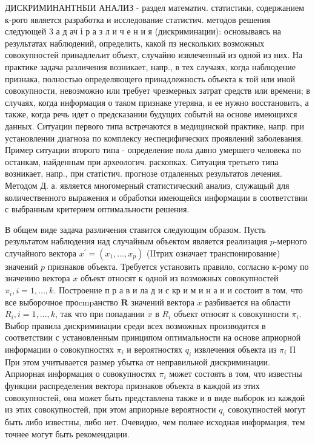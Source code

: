 \documentclass[10pt]{article}
\begin{document}
ДИСКРИМИНАНТНБІИ АНАЛИЗ - раздел математич. статистики, содержанием к-рого является разработка и исследование статистич. методов решения следующей 3 а д ач і р а з л и ч е н и я (дискриминации): основываясь на результатах наблюдений, определить, какой пз нескольких возможных совокупностей принадлељит объект, случайно извлеченный из одной из них. На практике задача различения возникает, напр., в тех случаях, когда наблюдение признака, полностью определяющего принадлежность объекта к той или иной совокупности, невозможно или требует чрезмерных затрат средств или времени; в случаях, когда информация о таком признаке утеряна, и ее нужно восстановить, а также, когда речь идет о предсказании будущих событıй на основе имеющихся данных. Ситуации первого типа встречаются в медицинской практике, напр. при установлении диагноза по комплексу неспецифических проявлений заболевания. Пример ситуации второго типа - определение пола давно умершего человека по останкам, найденным при археологич. раскопках. Ситуация третьего типа возникает, напр., при статістич. прогнозе отдаленных результатов лечения. Методом Д. а. является многомерный статистический анализ, служащый для количественного выражения и обработки имеющейся информации в соответствии с выбранным критерием оптимальности решения.



В общем виде задача различения ставится следующим образом. Пусть результатом наблюдения над случайным объектом является реализация $p$-мерного случайного вектора $x^{\prime}=\left(x_{1}, \ldots, x_{p}\right)$ (IIтрих означает транспонирование) значений $p$ признаков объекта. Требуется установить правило, согласно к-рому по значению вектора $x$ объект относят к одной из возможных совокупностей $\pi_{i}, i=1, \ldots, k$. Построение п р а в и ла д и с кр и м и н а и и состоит в том, что все выборочное проcmpанство $\boldsymbol{R}$ значений вектора $x$ разбивается на области $R_{i}, i=1, \ldots, k$, так что при попадании $x$ в $R_{i}$ объект относят к совокупности $\pi_{i}$. Выбор правила дискриминации среди всех возможных производится в соответствии с установленным принципом оптимальности на основе априорной информации о совокупностях $\pi_{i}$ и вероятностях $q_{i}$ извлечения объекта из $\pi_{i}$ П При этом учитывается размер убытка от неправильной дискриминации. Априорная информация о совокупностях $\pi_{i}$ может состоять в том, что известны функции распределения вектора признаков объекта в каждой из этих совокупностей, она может быть представлена также и в виде выборок из каждой из этих совокупностей, при этом априорные вероятности $q_{i}$ совокупностей могут быть либо известны, либо нет. Очевидно, чем полнее исходная информация, тем точнее могут быть рекомендации.
\end{document}
